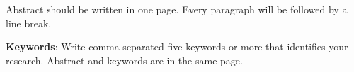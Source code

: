 Abstract should be written in one page. Every paragraph will be followed by a line break.

\textbf{Keywords}:   Write comma separated five keywords or more that identifies your research. Abstract and keywords are in the same page. 
